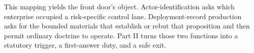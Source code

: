This mapping yields the front door's object. Actor-identification asks which enterprise occupied a risk-specific control lane. Deployment-record production asks for the bounded materials that establish or rebut that proposition and then permit ordinary doctrine to operate. Part II turns those two functions into a statutory trigger, a first-answer duty, and a safe exit.
